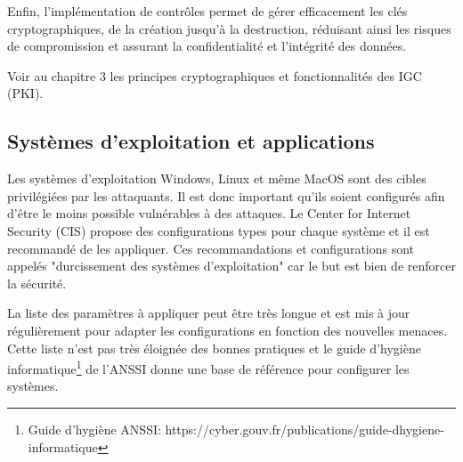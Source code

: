 Enfin, l'implémentation de contrôles permet de gérer efficacement les clés cryptographiques, de la création jusqu'à la destruction, réduisant ainsi les risques de compromission et assurant la confidentialité et l'intégrité des données.

Voir au chapitre 3 les principes cryptographiques et fonctionnalités des IGC (PKI).

\subsection{Systèmes d'exploitation et applications}

Les systèmes d'exploitation Windows, Linux et même MacOS sont des cibles privilégiées par les attaquants. Il est donc important qu'ils soient configurés afin d'être le moins possible vulnérables à des attaques. Le Center for Internet Security (CIS) propose des configurations types pour chaque système et il est recommandé de les appliquer. Ces recommandations et configurations sont appelés "durcissement des systèmes d'exploitation" car le but est bien de renforcer la sécurité.

La liste des paramètres à appliquer peut être très longue et est mis à jour régulièrement pour adapter les configurations en fonction des nouvelles menaces. Cette liste n'est pas très éloignée des bonnes pratiques et le guide d'hygiène informatique\footnote{Guide d'hygiène ANSSI: https://cyber.gouv.fr/publications/guide-dhygiene-informatique} de l'ANSSI donne une base de référence pour configurer les systèmes.


